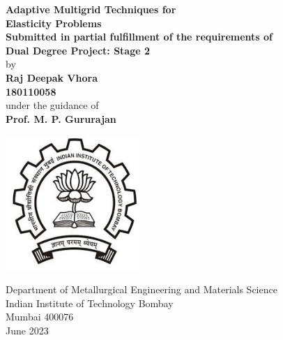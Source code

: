 \documentclass[12pt, a4paper]{report}
\begin{document}
\pagestyle{plain}
\def\title{Adaptive Multigrid Techniques for \\Elasticity Problems\\}
\def\what{Submitted in partial fulfillment of the requirements of \\ Dual Degree Project: Stage 2\\}
\def\who{Raj Deepak Vhora \\ 180110058}
\def\guide{Prof. M. P. Gururajan}


\large \begin {center} \vspace {0pt plus 2fil} {\LARGE \bf \title } 
\vspace {0pt plus 0.7fil} {\bf \what }
\vspace {0pt plus 0.2fil} by\\ 
\vspace {0pt plus 0.2fil} {\bf \who }\\ \vspace {0pt plus 0.5fil} under the guidance of\\ 
\vspace {0pt plus 0.2fil} {\bf \guide }\\ 
\vspace {0pt plus 1fil} \par 
\begin {center} 
    \includegraphics [height =2in]{iitblogo} 
\end {center} 
\par \Large Department of Metallurgical Engineering and Materials Science\\ 
Indian Institute of Technology Bombay \\ Mumbai 400076 \\
\vspace{10mm}
\Large June 2023
\end{center}


\cleardoublepage
\thispagestyle{empty}
\addtocounter{page}{-1}%
\mbox{}
\end{document}
